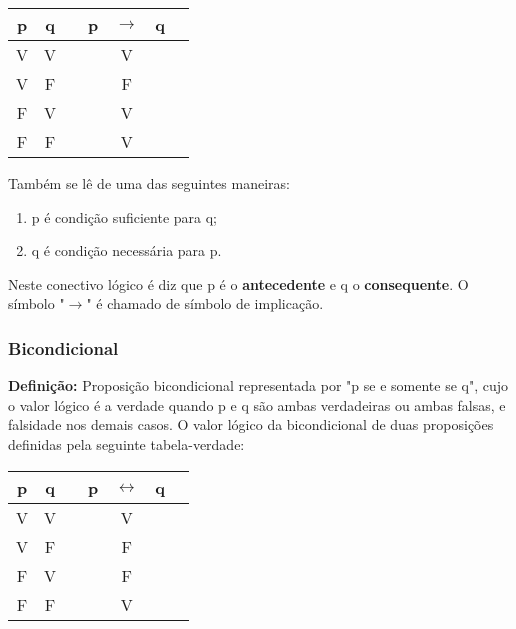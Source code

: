 \begin{center}
	\begin{tabular}{@{ }c@{ }@{ }c | c@{}@{ }c@{ }@{ }c@{ }@{ }c@{ }@{}c@{ }}
		p & q &  & p & $\to$ & q & \\
		\hline 
		V & V &  &  & V &  & \\
		V & F &  &  & F &  & \\
		F & V &  &  & V &  & \\
		F & F &  &  & V &  & \\
	\end{tabular}
\end{center}

Também se lê de uma das seguintes maneiras:

\begin{enumerate}[label=(\roman*)]
	\centering
	\item p é condição suficiente para q;
	\item q é condição necessária para p.
\end{enumerate}

Neste conectivo lógico é diz que p é o \textbf{antecedente} e q o \textbf{consequente}. O símbolo "$\to$" é chamado de símbolo de implicação.

		
		
		\subsubsection{Bicondicional}
		
\noindent \textbf{Definição:} Proposição bicondicional representada por "p se e somente se q", cujo o valor lógico é a verdade quando p e q são ambas verdadeiras ou ambas falsas, e falsidade nos demais casos. O valor lógico da bicondicional de duas proposições definidas pela seguinte tabela-verdade:

		

\begin{center}
	\begin{tabular}{@{ }c@{ }@{ }c | c@{}@{ }c@{ }@{ }c@{ }@{ }c@{ }@{}c@{ }}
		p & q &  & p & $\leftrightarrow$ & q & \\
		\hline 
		V & V &  &  & V &  & \\
		V & F &  &  & F &  & \\
		F & V &  &  & F &  & \\
		F & F &  &  & V &  & \\
	\end{tabular}
\end{center}

